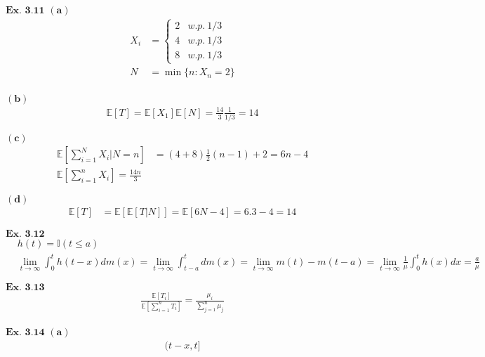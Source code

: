 \documentclass{article}
\begin{document}
\vspace{0.2in}
${\textbf{Ex. 3.11}}$
$\mathbf{(a)}$
\begin{align*}
X_i &= \left\{\begin{matrix}2&w.p.\ 1/3\\4&w.p.\ 1/3\\8&w.p.\ 1/3\end{matrix}\right.\\
N &= \min\{n: X_n = 2\}\\
\end{align*}

$\mathbf{(b)}$
\begin{align*}
\mathbb{E}[T] = \mathbb{E}[X_1]\mathbb{E}[N] = \frac{14}{3} \frac{1}{1/3} = 14
\end{align*}

$\mathbf{(c)}$
\begin{align*}
\mathbb{E}\left[\sum_{i=1}^{N}X_i|N=n\right] &= (4+8)\frac{1}{2}(n-1) + 2 = 6n-4\\
\mathbb{E}\left[\sum_{i=1}^{n}X_i\right] = \frac{14n}{3}
\end{align*}

$\mathbf{(d)}$
\begin{align*}
\mathbb{E}\left[T\right] &= \mathbb{E}[\mathbb{E}[T|N]] = \mathbb{E}[6N-4] = 6.3-4 = 14
\end{align*}

\vspace{0.2in}
${\textbf{Ex. 3.12}}$
\begin{align*}
&h(t) = \mathbb{I}(t\leq a)\\
&\lim_{t\rightarrow\infty}\int_{0}^{t}h(t-x)dm(x) = \lim_{t\rightarrow\infty}\int_{t-a}^{t}dm(x) = \lim_{t\rightarrow\infty} m(t)-m(t-a) = \lim_{t\rightarrow\infty}\frac{1}{\mu}\int_{0}^{t}h(x)dx = \frac{a}{\mu}
\end{align*}

\vspace{0.2in}
${\textbf{Ex. 3.13}}$
\begin{align*}
\frac{\mathbb{E}[T_i]}{\mathbb{E}[\sum_{i=1}^{n}T_i]} = \frac{\mu_i}{\sum_{j=1}^{n}\mu_j}
\end{align*}

\vspace{0.2in}
${\textbf{Ex. 3.14}}$
$\mathbf{(a)}$
\begin{align*}
(t-x,t]
\end{align*}
\end{document}
